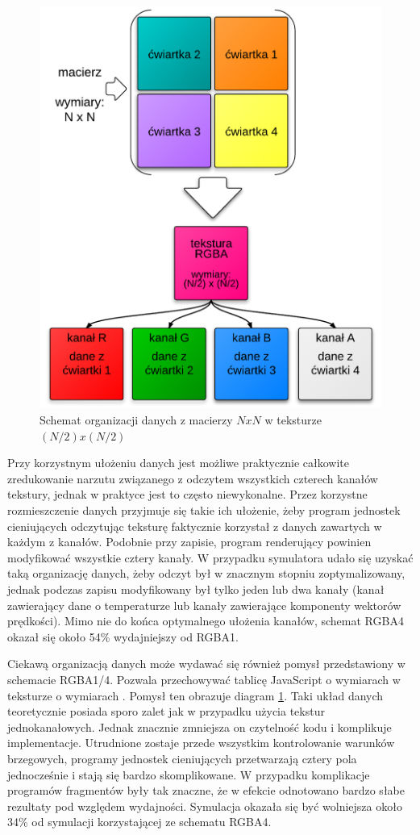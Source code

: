 \begin{figure}[!p]
\centering
\includegraphics[width=.65\textwidth]{img/rgba14Tex}
\caption{Schemat organizacji danych z macierzy $NxN$ w teksturze $(N/2)x(N/2)$}
\label{fig:rgba14Tex}
\end{figure}

Przy korzystnym ułożeniu danych jest możliwe praktycznie całkowite
zredukowanie narzutu związanego z odczytem wszystkich czterech kanałów
tekstury, jednak w praktyce jest to często niewykonalne. Przez korzystne
rozmieszczenie danych przyjmuje się takie ich ułożenie, żeby program jednostek
cieniujących odczytując teksturę faktycznie korzystał z danych zawartych w
każdym z kanałów. Podobnie przy zapisie, program renderujący powinien
modyfikować wszystkie cztery kanały. W przypadku symulatora 
udało się uzyskać taką organizację danych, żeby odczyt był w znacznym stopniu
zoptymalizowany, jednak podczas zapisu modyfikowany był tylko jeden lub dwa
kanały (kanał zawierający dane o temperaturze lub kanały zawierające
komponenty wektorów prędkości). Mimo nie do końca optymalnego ułożenia
kanałów, schemat RGBA4 okazał się około 54\% wydajniejszy od RGBA1.

Ciekawą organizacją danych może wydawać się również pomysł przedstawiony w
schemacie RGBA1/4. Pozwala przechowywać tablicę JavaScript o wymiarach
 w teksturze o wymiarach . Pomysł ten obrazuje diagram
\ref{fig:rgba14Tex}. Taki układ danych teoretycznie posiada sporo zalet jak w
przypadku użycia tekstur jednokanałowych. Jednak znacznie zmniejsza on
czytelność kodu i komplikuje implementacje. Utrudnione zostaje przede
wszystkim kontrolowanie warunków brzegowych, programy jednostek cieniujących
przetwarzają cztery pola jednocześnie i stają się bardzo skomplikowane. W
przypadku  komplikacje programów fragmentów były tak znaczne, że
w efekcie odnotowano bardzo słabe rezultaty pod względem wydajności. Symulacja
okazała się być wolniejsza około 34\% od symulacji korzystającej ze schematu
RGBA4.

